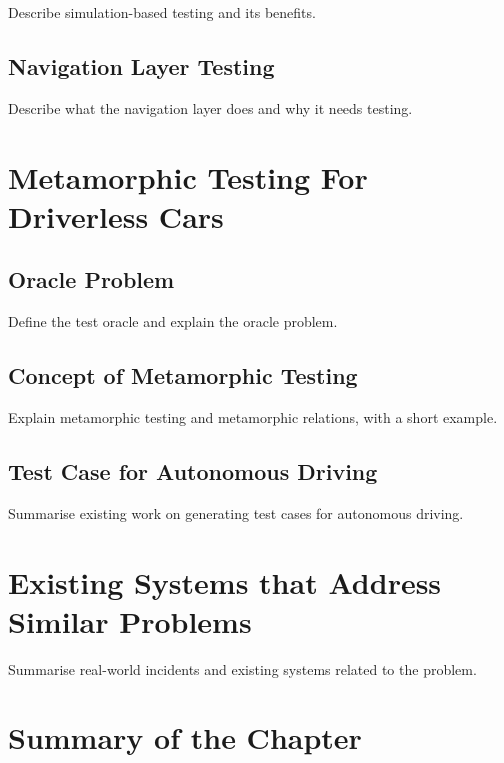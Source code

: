\documentclass[
  12pt,
  a4paper,
]{report}
\begin{document}
Describe simulation-based testing and its benefits.

\subsection{Navigation Layer Testing}\label{navigation-layer-testing}

Describe what the navigation layer does and why it needs testing.

\section{Metamorphic Testing For Driverless
Cars}\label{metamorphic-testing-for-driverless-cars}

\subsection{Oracle Problem}\label{oracle-problem}

Define the test oracle and explain the oracle problem.

\subsection{Concept of Metamorphic
Testing}\label{concept-of-metamorphic-testing}

Explain metamorphic testing and metamorphic relations, with a short
example.

\subsection{Test Case for Autonomous
Driving}\label{test-case-for-autonomous-driving}

Summarise existing work on generating test cases for autonomous driving.

\section{Existing Systems that Address Similar
Problems}\label{existing-systems-that-address-similar-problems}

Summarise real-world incidents and existing systems related to the
problem.

\section{Summary of the Chapter}\label{summary-of-the-chapter}
\end{document}
